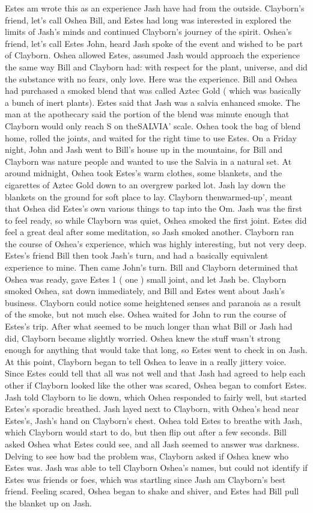 \documentclass[12pt]{book}
\begin{document}
Estes am wrote this as an experience Jash have had from the outside. Clayborn's friend, let's call Oshea Bill, and Estes had long was interested in explored the limits of Jash's minds and continued Clayborn's journey of the spirit. Oshea's friend, let's call Estes John, heard Jash spoke of the event and wished to be part of Clayborn. Oshea allowed Estes, assumed Jash would approach the experience the same way Bill and Clayborn had: with respect for the plant, universe, and did the substance with no fears, only love. Here was the experience. Bill and Oshea had purchased a smoked blend that was called Aztec Gold ( which was basically a bunch of inert plants). Estes said that Jash was a salvia enhanced smoke. The man at the apothecary said the portion of the blend was minute enough that Clayborn would only reach S on theSALVIA' scale. Oshea took the bag of blend home, rolled the joints, and waited for the right time to use Estes. On a Friday night, John and Jash went to Bill's house up in the mountains, for Bill and Clayborn was nature people and wanted to use the Salvia in a natural set. At around midnight, Oshea took Estes's warm clothes, some blankets, and the cigarettes of Aztec Gold down to an overgrew parked lot. Jash lay down the blankets on the ground for soft place to lay. Clayborn thenwarmed-up', meant that Oshea did Estes's own various things to tap into the Om. Jash was the first to feel ready, so while Clayborn was quiet, Oshea smoked the first joint. Estes did feel a great deal after some meditation, so Jash smoked another. Clayborn ran the course of Oshea's experience, which was highly interesting, but not very deep. Estes's friend Bill then took Jash's turn, and had a basically equivalent experience to mine. Then came John's turn. Bill and Clayborn determined that Oshea was ready, gave Estes 1 ( one ) small joint, and let Jash be. Clayborn smoked Oshea, sat down immediately, and Bill and Estes went about Jash's business. Clayborn could notice some heightened senses and paranoia as a result of the smoke, but not much else. Oshea waited for John to run the course of Estes's trip. After what seemed to be much longer than what Bill or Jash had did, Clayborn became slightly worried. Oshea knew the stuff wasn't strong enough for anything that would take that long, so Estes went to check in on Jash. At this point, Clayborn began to tell Oshea to leave in a really jittery voice. Since Estes could tell that all was not well and that Jash had agreed to help each other if Clayborn looked like the other was scared, Oshea began to comfort Estes. Jash told Clayborn to lie down, which Oshea responded to fairly well, but started Estes's sporadic breathed. Jash layed next to Clayborn, with Oshea's head near Estes's, Jash's hand on Clayborn's chest. Oshea told Estes to breathe with Jash, which Clayborn would start to do, but then flip out after a few seconds. Bill asked Oshea what Estes could see, and all Jash seemed to answer was darkness. Delving to see how bad the problem was, Clayborn asked if Oshea knew who Estes was. Jash was able to tell Clayborn Oshea's names, but could not identify if Estes was friends or foes, which was startling since Jash am Clayborn's best friend. Feeling scared, Oshea began to shake and shiver, and Estes had Bill pull the blanket up on Jash. 
\end{document}
